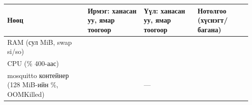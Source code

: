 \begingroup\scriptsize\begin{longtable}[]{@{}llll@{}}
\toprule
\begin{minipage}[b]{0.22\columnwidth}\raggedright
Нөөц\strut
\end{minipage} & \begin{minipage}[b]{0.22\columnwidth}\raggedright
Ирмэг: ханасан уу, ямар тоогоор\strut
\end{minipage} & \begin{minipage}[b]{0.22\columnwidth}\raggedright
Үүл: ханасан уу, ямар тоогоор\strut
\end{minipage} & \begin{minipage}[b]{0.22\columnwidth}\raggedright
Нотолгоо (хүснэгт/багана)\strut
\end{minipage}\tabularnewline
\midrule
\endhead
\begin{minipage}[t]{0.22\columnwidth}\raggedright
RAM (сул MiB, swap si/so)\strut
\end{minipage} & \begin{minipage}[t]{0.22\columnwidth}\raggedright
\strut
\end{minipage} & \begin{minipage}[t]{0.22\columnwidth}\raggedright
\strut
\end{minipage} & \begin{minipage}[t]{0.22\columnwidth}\raggedright
\strut
\end{minipage}\tabularnewline
\begin{minipage}[t]{0.22\columnwidth}\raggedright
CPU (\% 400-аас)\strut
\end{minipage} & \begin{minipage}[t]{0.22\columnwidth}\raggedright
\strut
\end{minipage} & \begin{minipage}[t]{0.22\columnwidth}\raggedright
\strut
\end{minipage} & \begin{minipage}[t]{0.22\columnwidth}\raggedright
\strut
\end{minipage}\tabularnewline
\begin{minipage}[t]{0.22\columnwidth}\raggedright
mosquitto контейнер (128 MiB-ийн \%, OOMKilled)\strut
\end{minipage} & \begin{minipage}[t]{0.22\columnwidth}\raggedright
\strut
\end{minipage} & \begin{minipage}[t]{0.22\columnwidth}\raggedright
---\strut
\end{minipage} & \begin{minipage}[t]{0.22\columnwidth}\raggedright

\end{minipage}
\end{longtable}

